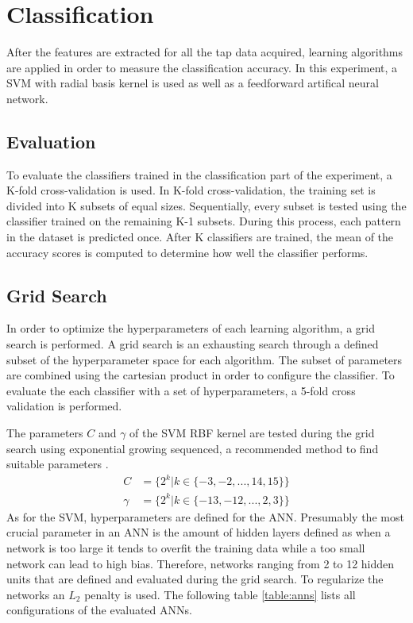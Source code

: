 \section{Classification}
After the features are extracted for all the tap data acquired, learning algorithms are applied in order to measure the classification accuracy. In this experiment, a SVM with radial basis kernel is used as well as a feedforward artifical neural network.

\subsection{Evaluation}
To evaluate the classifiers trained in the classification part of the experiment, a K-fold cross-validation is used. In K-fold cross-validation, the training set is divided into K subsets of equal sizes. Sequentially, every subset is tested using the classifier trained on the remaining K-1 subsets. During this process, each pattern in the dataset is predicted once. After K classifiers are trained, the mean of the accuracy scores is computed to determine how well the classifier performs.

\subsection{Grid Search}
In order to optimize the hyperparameters of each learning algorithm, a grid search is performed. A grid search is an exhausting search through a defined subset of the hyperparameter space for each algorithm. The subset of parameters are combined using the cartesian product in order to configure the classifier. To evaluate the each classifier with a set of hyperparameters, a 5-fold cross validation is performed.

The parameters $C$ and $\gamma$ of the SVM RBF kernel are tested during the grid search using exponential growing sequenced, a recommended method to find suitable parameters \cite{hsu2003practical}.
\begin{align}
  C &= \{ 2^{k} | k \in \{-3, -2, ..., 14, 15\} \}\\ 
  \gamma &= \{ 2^{k} | k \in \{-13, -12, ..., 2, 3\} \}
\end{align}
As for the SVM, hyperparameters are defined for the ANN. Presumably the most crucial parameter in an ANN is the amount of hidden layers defined as when a network is too large it tends to overfit the training data while a too small network can lead to high bias. Therefore, networks ranging from 2 to 12 hidden units that are defined and evaluated during the grid search. To regularize the networks an $L_2$ penalty \cite{ng2004feature} is used. The following table \ref{table:anns} lists all configurations of the evaluated ANNs.

